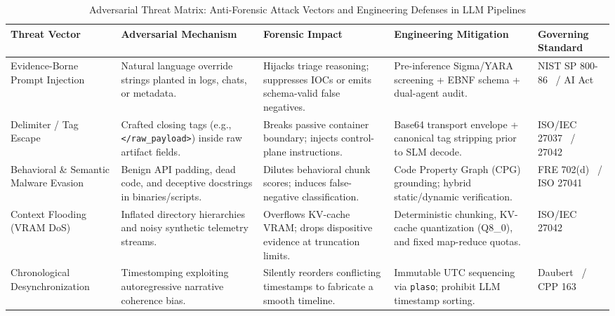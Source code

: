 \begin{table}[!t]
\caption{Adversarial Threat Matrix: Anti-Forensic Attack Vectors and Engineering Defenses in LLM Pipelines}
\label{tab:adversarial_matrix}
\centering
\scriptsize
\setlength{\tabcolsep}{4pt}
\begin{tabular}{p{2.7cm}p{3.7cm}p{3.3cm}p{4.3cm}p{2.4cm}}
\toprule
\textbf{Threat Vector} & \textbf{Adversarial Mechanism} & \textbf{Forensic Impact} & \textbf{Engineering Mitigation} & \textbf{Governing Standard} \\
\midrule
Evidence-Borne Prompt Injection & Natural language override strings planted in logs, chats, or metadata. & Hijacks triage reasoning; suppresses IOCs or emits schema-valid false negatives. & Pre-inference Sigma/YARA screening + EBNF schema + dual-agent audit. & NIST SP 800-86~\cite{nist_sp800_86} / AI Act~\cite{eu_ai_act_2024} \\
\addlinespace
Delimiter / Tag Escape & Crafted closing tags (e.g., \texttt{</raw\_payload>}) inside raw artifact fields. & Breaks passive container boundary; injects control-plane instructions. & Base64 transport envelope + canonical tag stripping prior to SLM decode. & ISO/IEC 27037~\cite{iso27037_2012} / 27042~\cite{iso27042_2015} \\
\addlinespace
Behavioral \& Semantic Malware Evasion & Benign API padding, dead code, and deceptive docstrings in binaries/scripts. & Dilutes behavioral chunk scores; induces false-negative classification. & Code Property Graph (CPG) grounding; hybrid static/dynamic verification. & FRE 702(d)~\cite{fre702_2023} / ISO 27041~\cite{iso27041_2015} \\
\addlinespace
Context Flooding (VRAM DoS) & Inflated directory hierarchies and noisy synthetic telemetry streams. & Overflows KV-cache VRAM; drops dispositive evidence at truncation limits. & Deterministic chunking, KV-cache quantization (Q8\_0), and fixed map-reduce quotas. & ISO/IEC 27042~\cite{iso27042_2015} \\
\addlinespace
Chronological Desynchronization & Timestomping exploiting autoregressive narrative coherence bias. & Silently reorders conflicting timestamps to fabricate a smooth timeline. & Immutable UTC sequencing via \texttt{plaso}; prohibit LLM timestamp sorting. & Daubert~\cite{daubert1993} / CPP 163~\cite{portugal_cpp} \\
\bottomrule
\end{tabular}
\end{table}
